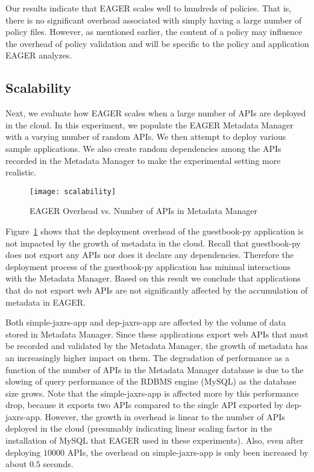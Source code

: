 Our results indicate that EAGER scales well to hundreds of policies. That is,
there is no significant overhead associated with simply having a large number
of policy files. However, as mentioned earlier, the content of a policy may
influence the overhead of policy validation and will be specific to the policy and 
application EAGER analyzes.
 
\subsection{Scalability}
Next, we evaluate how EAGER scales when a large number of APIs are deployed 
in the cloud. In this experiment, we populate the EAGER
Metadata Manager with a varying number of random APIs. We then attempt to deploy various sample 
applications. We also create random dependencies among the APIs recorded in the 
Metadata Manager to make the experimental setting more realistic.

\begin{figure}
\centering
\texttt{[image: scalability]}
\caption{EAGER Overhead vs. Number of APIs in Metadata Manager}
\label{fig:scalability}
\end{figure}

Figure~\ref{fig:scalability} shows that the deployment overhead of the 
guestbook-py application is not impacted by the growth of metadata
in the cloud. Recall that guestbook-py does not export any APIs nor does it 
declare any dependencies. Therefore the deployment process of
the guestbook-py application has minimal interactions with the 
Metadata Manager. Based on this result we conclude that applications that
do not export web APIs are not significantly affected by the accumulation 
of metadata in EAGER.

Both simple-jaxrs-app and dep-jaxrs-app are
affected by the volume of data stored in Metadata Manager. Since these applications 
export web APIs that must be recorded and validated by the Metadata Manager, 
the growth of metadata has an increasingly higher impact on them. 
The degradation 
of performance as a function of the number of APIs in the Metadata Manager
database is due to the slowing of query performance of the RDBMS engine (MySQL) 
as the database size grows. Note that the simple-jaxrs-app
is affected more by this performance drop, because it exports two APIs compared to the single API exported 
by dep-jaxrs-app. However, the growth
in overhead is linear to the number of APIs deployed in the cloud (presumably
indicating linear scaling factor in the installation of MySQL that EAGER used
in these experiments). Also,
even after deploying $10000$ APIs, the overhead on simple-jaxrs-app is only been increased by 
about $0.5$ seconds.

